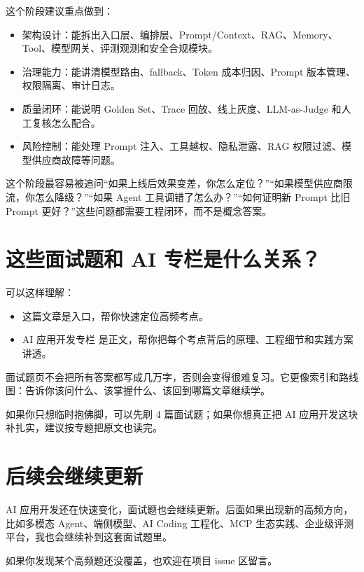 \documentclass[9pt,a4paper,twocolumn]{ctexart}
\begin{document}
这个阶段建议重点做到：


\begin{itemize}[itemsep=1pt, topsep=2pt]
  \item 架构设计：能拆出入口层、编排层、Prompt/Context、RAG、Memory、Tool、模型网关、评测观测和安全合规模块。
  \item 治理能力：能讲清模型路由、fallback、Token 成本归因、Prompt 版本管理、权限隔离、审计日志。
  \item 质量闭环：能说明 Golden Set、Trace 回放、线上灰度、LLM-as-Judge 和人工复核怎么配合。
  \item 风险控制：能处理 Prompt 注入、工具越权、隐私泄露、RAG 权限过滤、模型供应商故障等问题。
\end{itemize}


这个阶段最容易被追问“如果上线后效果变差，你怎么定位？”“如果模型供应商限流，你怎么降级？”“如果 Agent 工具调错了怎么办？”“如何证明新 Prompt 比旧 Prompt 更好？”这些问题都需要工程闭环，而不是概念答案。



\section*{这些面试题和 AI 专栏是什么关系？}


可以这样理解：


\begin{itemize}[itemsep=1pt, topsep=2pt]
  \item 这篇文章是入口，帮你快速定位高频考点。
  \item AI 应用开发专栏 是正文，帮你把每个考点背后的原理、工程细节和实践方案讲透。
\end{itemize}


面试题页不会把所有答案都写成几万字，否则会变得很难复习。它更像索引和路线图：告诉你该问什么、该掌握什么、该回到哪篇文章继续学。



如果你只想临时抱佛脚，可以先刷 4 篇面试题；如果你想真正把 AI 应用开发这块补扎实，建议按专题把原文也读完。



\section*{后续会继续更新}


AI 应用开发还在快速变化，面试题也会继续更新。后面如果出现新的高频方向，比如多模态 Agent、端侧模型、AI Coding 工程化、MCP 生态实践、企业级评测平台，我也会继续补到这套面试题里。



如果你发现某个高频题还没覆盖，也欢迎在项目 issue 区留言。
\end{document}
